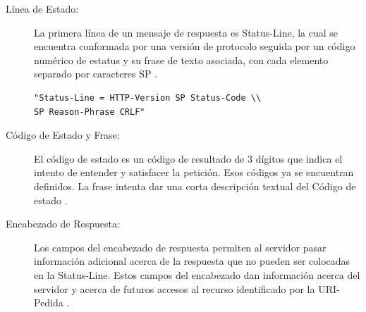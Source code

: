 \begin{description}

\item[Línea de Estado: ]
La primera línea de un mensaje de respuesta es Status-Line, la cual se encuentra conformada por una versión de protocolo seguida por un código numérico de estatus y su frase de texto asociada, con cada elemento separado por caracteres SP \cite{rfc2616}.

\begin{lstlisting}[caption={Línea de Estado},label={lst:linea_estado}]
"Status-Line = HTTP-Version SP Status-Code \\ 
SP Reason-Phrase CRLF"
\end{lstlisting}

\item[Código de Estado y Frase: ]
El código de estado es un código de resultado de 3 dígitos que indica el intento de entender y satisfacer la petición. Esos códigos ya se encuentran definidos. La frase intenta dar una corta descripción textual del Código de estado \cite{rfc2616}.

\item[Encabezado de Respuesta: ]
Los campos del encabezado de respuesta permiten al servidor pasar información adicional acerca de la respuesta que no pueden ser colocadas en la Status-Line. Estos campos del encabezado dan información acerca del servidor y acerca de futuros accesos al recurso identificado por la URI-Pedida \cite{rfc2616}.
\end{description}